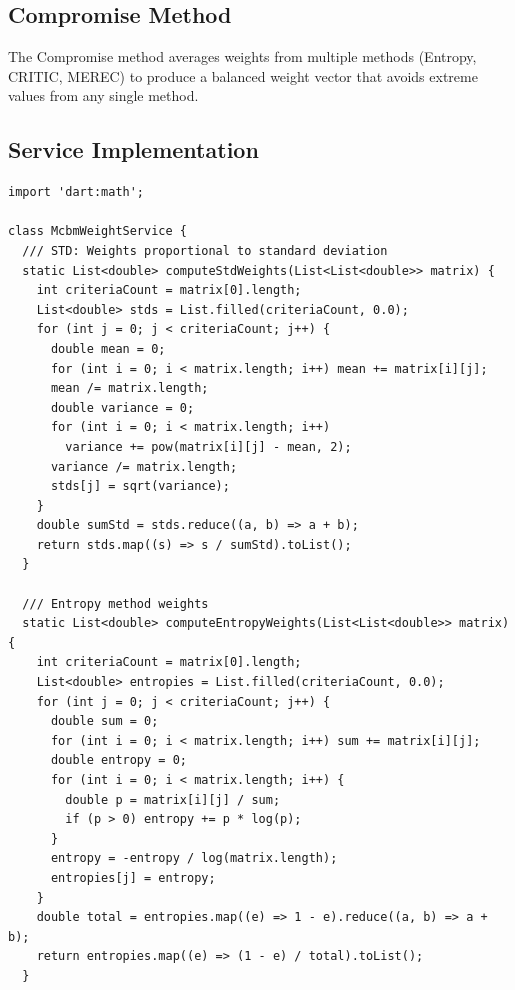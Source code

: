 \documentclass[12pt,a4paper,oneside]{report}
\begin{document}
\subsection{Compromise Method}

The Compromise method averages weights from multiple methods (Entropy, CRITIC, MEREC) to produce a balanced weight vector that avoids extreme values from any single method.

\subsection{Service Implementation}

\begin{lstlisting}[style=dartstyle]
import 'dart:math';

class McbmWeightService {
  /// STD: Weights proportional to standard deviation
  static List<double> computeStdWeights(List<List<double>> matrix) {
    int criteriaCount = matrix[0].length;
    List<double> stds = List.filled(criteriaCount, 0.0);
    for (int j = 0; j < criteriaCount; j++) {
      double mean = 0;
      for (int i = 0; i < matrix.length; i++) mean += matrix[i][j];
      mean /= matrix.length;
      double variance = 0;
      for (int i = 0; i < matrix.length; i++)
        variance += pow(matrix[i][j] - mean, 2);
      variance /= matrix.length;
      stds[j] = sqrt(variance);
    }
    double sumStd = stds.reduce((a, b) => a + b);
    return stds.map((s) => s / sumStd).toList();
  }

  /// Entropy method weights
  static List<double> computeEntropyWeights(List<List<double>> matrix) {
    int criteriaCount = matrix[0].length;
    List<double> entropies = List.filled(criteriaCount, 0.0);
    for (int j = 0; j < criteriaCount; j++) {
      double sum = 0;
      for (int i = 0; i < matrix.length; i++) sum += matrix[i][j];
      double entropy = 0;
      for (int i = 0; i < matrix.length; i++) {
        double p = matrix[i][j] / sum;
        if (p > 0) entropy += p * log(p);
      }
      entropy = -entropy / log(matrix.length);
      entropies[j] = entropy;
    }
    double total = entropies.map((e) => 1 - e).reduce((a, b) => a + b);
    return entropies.map((e) => (1 - e) / total).toList();
  }


\end{lstlisting}
\end{document}
